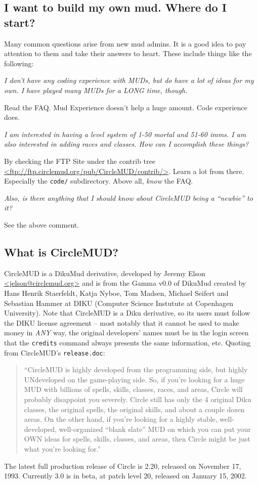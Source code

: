 \documentclass[11pt]{article}
\begin{document}
\subsection{I want to build my own mud.  Where do I start?}
Many common questions arise from new mud admins.  It is a good idea to pay attention to them and take their answers to heart.  These include things like the following:
\par
{\em I don't have any coding experience with MUDs, but do have a lot of ideas for my own.  I have played many MUDs for a LONG time, though.}
\par
Read the FAQ.  Mud Experience doesn't help a huge amount.  Code experience does.
\par
{\em I am interested in having a level system of 1-50 mortal and 51-60 imms.  I am also interested in adding races and classes. How can I accomplish these things?}
\par
By checking the FTP Site under the contrib tree \url{<ftp://ftp.circlemud.org/pub/CircleMUD/contrib/>}.  Learn a lot from there.  Especially the \texttt{code/} subdirectory.  Above all, {\em know} the FAQ.
\par
{\em Also, is there anything that I should know about CircleMUD being a ``newbie'' to it?}
\par
See the above comment.

\subsection{What is CircleMUD?}
CircleMUD is a DikuMud derivative, developed by Jeremy Elson \url{<jelson@circlemud.org>}
and is from the Gamma v0.0 of DikuMud created by Hans Henrik Staerfeldt, Katja Nyboe, Tom
Madsen, Michael Seifert and Sebastian Hammer at DIKU (Computer Science Instutute at Copenhagen University).  Note that CircleMUD is a Diku derivative, so its users must follow the DIKU license agreement -- most notably that it cannot be used to make money in {\em ANY} way, the original developers' names must be in the login screen that the \texttt{credits} command always presents the same information, etc.\newline
Quoting from CircleMUD's \texttt{release.doc}:
\begin{quote}
``CircleMUD is highly developed from the programming side, but highly UNdeveloped on the game-playing side.  So, if you're looking for a huge MUD with billions of spells, skills, classes, races, and areas, Circle will probably disappoint you severely.  Circle still has only the 4 original Diku classes, the original spells, the original skills, and about a couple dozen areas. On the other hand, if you're looking for a highly stable, well-developed, well-organized ``blank slate'' MUD on which you can put your OWN ideas for spells, skills, classes, and areas, then Circle might be just what you're looking for.''
\end{quote}
The latest full production release of Circle is 2.20, released on November 17, 1993.  
Currently 3.0 is in beta, at patch level 20, released on January 15, 2002.
\end{document}
